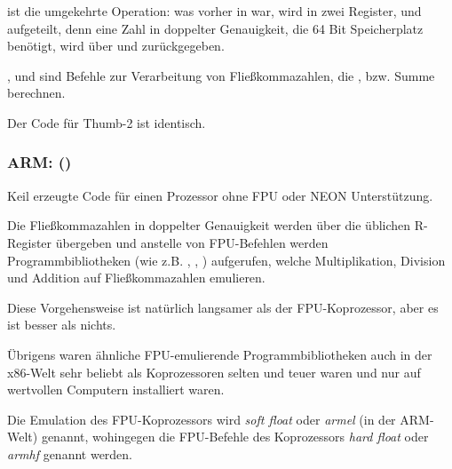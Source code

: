  ist die umgekehrte Operation: was vorher in 
war, wird in zwei Register,  und  aufgeteilt, denn eine Zahl in
doppelter Genauigkeit, die 64 Bit Speicherplatz benötigt, wird über  und
 zurückgegeben.

,  und  sind Befehle zur Verarbeitung von
Fließkommazahlen, die ,  bzw. Summe berechnen.

Der Code für Thumb-2 ist identisch.

\subsubsection{ARM: \OptimizingKeilVI (\ThumbMode)}



Keil erzeugte Code für einen Prozessor ohne FPU oder NEON Unterstützung.

Die Fließkommazahlen in doppelter Genauigkeit werden über die üblichen
R-Register übergeben und anstelle von FPU-Befehlen werden Programmbibliotheken
(wie z.B. , , )
aufgerufen, welche Multiplikation, Division und Addition auf Fließkommazahlen
emulieren. 

Diese Vorgehensweise ist natürlich langsamer als der FPU-Koprozessor, aber es
ist besser als nichts.

Übrigens waren ähnliche FPU-emulierende Programmbibliotheken auch in der
x86-Welt sehr beliebt als Koprozessoren selten und teuer waren und nur auf
wertvollen Computern installiert waren.

Die Emulation des FPU-Koprozessors wird \emph{soft float} oder \emph{armel} (in der
ARM-Welt) genannt, wohingegen die FPU-Befehle des Koprozessors \emph{hard float}
oder \emph{armhf} genannt werden.

\iffalse
\myindex{Raspberry Pi}
Der Linux Kernel des Raspberry Pi beispielsweise wird in zwei Varianten
kompiliert.

Im Falle von \emph{soft float} werden Parameter über R-Register übergeben und im
Falle von \emph{hard float} über D-Register.

Diese Tatsache hält einen davon ab armhf-Programmbibliotheken für armel-Code
oder umgekehrt zu verwenden und dies ist der Grund warum der gesamte Code in
Linux-Distributionen speziell für eine der beiden Konventionen kompiliert wird.
\fi


